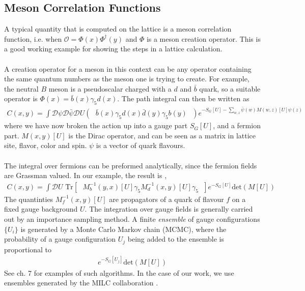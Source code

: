 \documentclass[a4paper,10pt]{article}
\numberwithin{equation}{section}
\begin{document}
\subsection{Meson Correlation Functions}
\label{sec:correlators}

A typical quantity that is computed on the lattice is a meson correlation function, i.e. when $\mathcal{O} = \Phi(x)\Phi^{\dagger}(y)$ and $\Phi$ is a meson creation operator. This is a good working example for showing the steps in a lattice calculation. 
\\ \\
A creation operator for a meson in this context can be any operator containing the same quantum numbers as the meson one is trying to create. For example, the neutral $B$ meson is a pseudoscalar charged with a $d$ and $\bar{b}$ quark, so a suitable operator is $\Phi(x) = \bar{b}(x)\gamma_5 d(x)$. The path integral can then be written as 
\begin{align}
	C(x,y) = \int \mathcal{D}\psi \mathcal{D}\bar{\psi} \mathcal{D}U \left(\text{ } \bar{b}(x)\gamma_5 d(x) \bar{d}(y)\gamma_5 b(y) \text{ }\right) e^{-S_G[U]-\sum_{w,z} \bar{\psi}(w)M(w,z)[U]\psi(z)}
\end{align}
where we have now broken the action up into a gauge part $S_G[U]$, and a fermion part. $M(x,y)[U]$ is the Dirac operator, and can be seen as a matrix in lattice site, flavor, color and spin. $\psi$ is a vector of quark flavours.
\\ \\
The integral over fermions can be preformed analytically, since the fermion fields are Grassman valued. In our example, the result is \cite{Peskin:1995ev},
\begin{align}
	C(x,y) = \int \mathcal{D}U \text{ Tr}\left[\text{ } M^{-1}_b(y,x)[U] \gamma_5 M^{-1}_d(x,y)[U] \gamma_5 \text{ }\right] e^{-S_G[U]} \text{det}(M[U])
\end{align}
The quantinties $M^{-1}_f(x,y)[U]$ are propagators of a quark of flavour $f$ on a fixed gauge background $U$. The integration over gauge fields is generally carried out by an importance sampling method. A finite \textit{ensemble} of gauge configurations $\{U_i\}$ is generated by a Monte Carlo Markov chain (MCMC), where the probability of a gauge configuration $U_j$ being added to the ensemble is proportional to 
\begin{align}
	e^{-S_G[U_j]}\text{det}(M[U])
	\label{eq:MCweight}
\end{align}
See \cite{DeGrand:2006zz} ch. 7 for examples of such algorithms. In the case of our work, we use ensembles generated by the MILC collaboration \cite{Bazavov:2012xda}.
\end{document}
